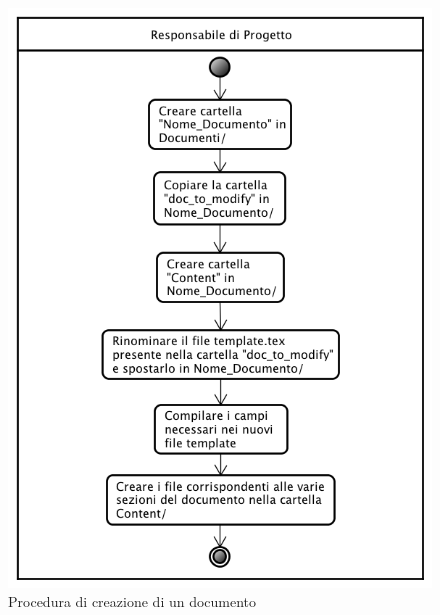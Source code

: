 \begin{figure}[!h]
\centering
	\includegraphics[scale=0.5]{./content/Immagini/Creazione_Doc.png}
	\caption{Procedura di creazione di un documento}
	\label{proc_creazione}
\end{figure}

